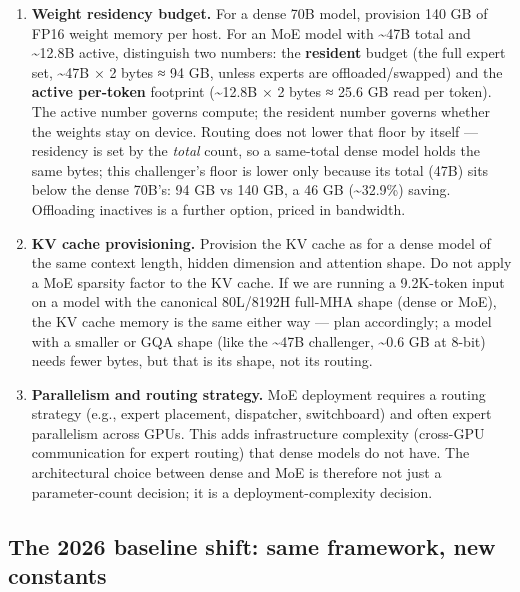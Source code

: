 \begin{enumerate}
\def\labelenumi{\arabic{enumi}.}
\item
  \textbf{Weight residency budget.} For a dense 70B model, provision 140
  GB of FP16 weight memory per host. For an MoE model with
  \textasciitilde47B total and \textasciitilde12.8B active, distinguish
  two numbers: the \textbf{resident} budget (the full expert set,
  \textasciitilde47B × 2 bytes ≈ 94 GB, unless experts are
  offloaded/swapped) and the \textbf{active per-token} footprint
  (\textasciitilde12.8B × 2 bytes ≈ 25.6 GB read per token). The active
  number governs compute; the resident number governs whether the
  weights stay on device. Routing does not lower that floor by itself
  --- residency is set by the \emph{total} count, so a same-total dense
  model holds the same bytes; this challenger's floor is lower only
  because its total (47B) sits below the dense 70B's: 94 GB vs 140 GB, a
  46 GB (\textasciitilde32.9\%) saving. Offloading inactives is a
  further option, priced in bandwidth.
\item
  \textbf{KV cache provisioning.} Provision the KV cache as for a dense
  model of the same context length, hidden dimension and attention
  shape. Do not apply a MoE sparsity factor to the KV cache. If we are
  running a 9.2K-token input on a model with the canonical 80L/8192H
  full-MHA shape (dense or MoE), the KV cache memory is the same either
  way --- plan accordingly; a model with a smaller or GQA shape (like
  the \textasciitilde47B challenger, \textasciitilde0.6 GB at 8-bit)
  needs fewer bytes, but that is its shape, not its routing.
\item
  \textbf{Parallelism and routing strategy.} MoE deployment requires a
  routing strategy (e.g., expert placement, dispatcher, switchboard) and
  often expert parallelism across GPUs. This adds infrastructure
  complexity (cross-GPU communication for expert routing) that dense
  models do not have. The architectural choice between dense and MoE is
  therefore not just a parameter-count decision; it is a
  deployment-complexity decision.
\end{enumerate}

\subsection{The 2026 baseline shift: same framework, new
constants}\label{the-2026-baseline-shift-same-framework-new-constants}

